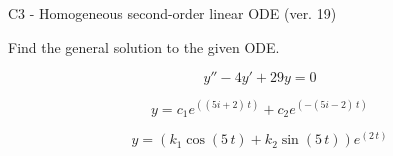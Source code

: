 \begin{exercise}
  \begin{exerciseTitle}C3 - Homogeneous second-order linear ODE (ver. 19)\end{exerciseTitle}
  \begin{exerciseStatement}
    
Find the general solution to the given ODE.

    
\[y''-4y'+29y = 0\]

  \end{exerciseStatement}
  \begin{exerciseAnswer}
    
\[y= c_{1} e^{\left(\left(5 i + 2\right) \, t\right)} + c_{2} e^{\left(-\left(5 i - 2\right) \, t\right)}\]

    
\[y= {\left(k_{1} \cos\left(5 \, t\right) + k_{2} \sin\left(5 \, t\right)\right)} e^{\left(2 \, t\right)}\]

  \end{exerciseAnswer}
\end{exercise}